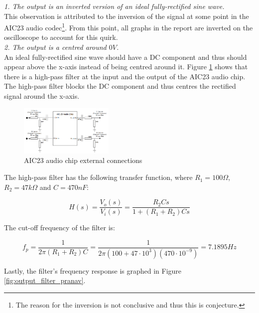 \documentclass{article}
\begin{document}
\textit{1. The output is an inverted version of an ideal fully-rectified sine wave.}\\

This observation is attributed to the inversion of the signal at some point in the AIC23 audio codec\footnote{The reason for the inversion is not conclusive and thus this is conjecture.}. From this point, all graphs in the report are inverted on the oscilloscope to account for this quirk.\\  

\textit{2. The output is a centred around $0V$.} \\

An ideal fully-rectified sine wave should have a DC component and thus should appear above the x-axis instead of being centred around it.  Figure \ref{fig:aic23} shows that there is a high-pass filter at the input and the output of the AIC23 audio chip. The high-pass filter blocks the DC component and thus centres the rectified signal around the x-axis.\\

\begin{figure}[H]
\centering
\includegraphics[width=0.4\textwidth]{AIC23.PNG}
\caption{AIC23 audio chip external connections\cite{AIC23_technical_reference}}
\label{fig:aic23}
\end{figure}

The high-pass filter has the following transfer function, where $R_{1}=100 \Omega$, $R_{2}=47 k\Omega$ and $C=470nF$:

\begin{equation}
    H(s)=\frac{V_o(s)}{V_{i}(s)} = \frac{R_{2}Cs}{1 + (R_{1}+R_{2})Cs}   
\end{equation}

The cut-off frequency of the filter is:

\begin{equation}
     f_p = \frac{1}{2\pi (R_1+R_2)C} = \frac{1}{2\pi (100 + 47\cdot 10^{3})(470\cdot 10^{-9})} = 7.1895Hz
\end{equation}

Lastly, the filter's frequency response is graphed in Figure \ref{fig:output_filter_pranav}.
\end{document}
